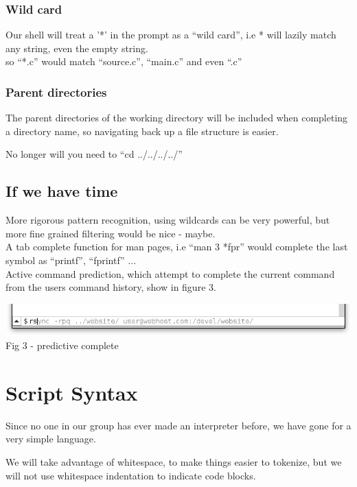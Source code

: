 \documentclass[a4paper,12pt]{article}
\begin{document}
\subsubsection*{Wild card}
Our shell will treat a '*' in the prompt as a ``wild card'', i.e * will lazily match any string, even the empty string. \\
so ``*.c'' would match ``source.c'', ``main.c'' and even ``.c''

\subsubsection*{Parent directories}

The parent directories of the working directory will be included when completing a directory name, so navigating back up a file structure is easier.

No longer will you need to ``cd ../../../../''

\subsection*{If we have time}
More rigorous pattern recognition, using wildcards can be very powerful, but more fine grained filtering would be nice - maybe.\\[0.5cm]
A tab complete function for man pages, i.e ``man 3 *fpr'' would complete the last symbol as ``printf'',  ``fprintf'' ...\\[0.5cm]
Active command prediction, which attempt to complete the current command from the users command history, show in figure 3. 

\begin{center}
  \includegraphics[width=14cm]{autocomplete.png}\\
  \small Fig 3 - predictive complete
\end{center}

\pagebreak
\section*{Script Syntax}
Since no one in our group has ever made an interpreter before, we have gone for a very simple language.

We will take advantage of whitespace, to make things easier to tokenize, but we will not use whitespace indentation to indicate code blocks.
\end{document}
